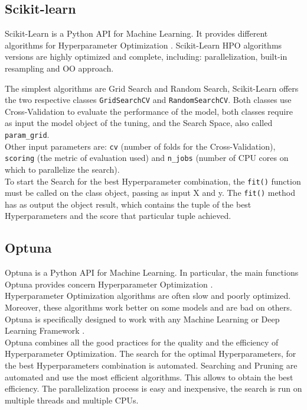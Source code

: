 \subsection{Scikit-learn}

Scikit-Learn is a Python API for Machine Learning. It provides different algorithms for Hyperparameter Optimization \cite{scikit-learn}.
Scikit-Learn HPO algorithms versions are highly optimized and complete, including: parallelization, built-in resampling and OO approach.

The simplest algorithms are Grid Search and Random Search, Scikit-Learn offers the two respective classes \texttt{GridSearchCV} and \texttt{RandomSearchCV}.
Both classes use Cross-Validation to evaluate the performance of the model, both classes require as input the model object of the tuning, and the Search Space, also called \texttt{param\_grid}.
\\[0.3cm]Other input parameters are: \texttt{cv} (number of folds for the Cross-Validation), \texttt{scoring} (the metric of evaluation used) and \texttt{n\_jobs} (number of CPU cores on which to parallelize the search).
\\[0.3cm]To start the Search for the best Hyperparameter combination, the \texttt{fit()} function must be called on the class object, passing as input X and y.
The \texttt{fit()} method has as output the object result, which contains the tuple of the best Hyperparameters and the score that particular tuple achieved.

\subsection{Optuna}

Optuna is a Python API for Machine Learning. In particular, the main functions Optuna provides concern Hyperparameter Optimization \cite{Optuna}.
% 
% 
\\[0.3cm]Hyperparameter Optimization algorithms are often slow and poorly optimized. Moreover, these algorithms work better on some models and are bad on others.
Optuna is specifically designed to work with any Machine Learning or Deep Learning Framework \cite{Tesi-1.5}.
% 
\\[0.3cm]Optuna combines all the good practices for the quality and the efficiency of Hyperparameter Optimization.
The search for the optimal Hyperparameters, for the best Hyperparameters combination is automated.
Searching and Pruning are automated and use the most efficient algorithms. This allows to obtain the best efficiency.
The parallelization process is easy and inexpensive, the search is run on multiple threads and multiple CPUs.

